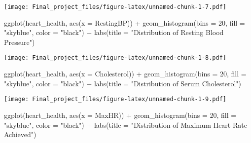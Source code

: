 \documentclass[
]{article}
\newenvironment{Shaded}{\begin{snugshade}}{\end{snugshade}}
\newcommand{\AttributeTok}[1]{\textcolor[rgb]{0.77,0.63,0.00}{#1}}
\newcommand{\DecValTok}[1]{\textcolor[rgb]{0.00,0.00,0.81}{#1}}
\newcommand{\FunctionTok}[1]{\textcolor[rgb]{0.00,0.00,0.00}{#1}}
\newcommand{\NormalTok}[1]{#1}
\newcommand{\SpecialCharTok}[1]{\textcolor[rgb]{0.00,0.00,0.00}{#1}}
\newcommand{\StringTok}[1]{\textcolor[rgb]{0.31,0.60,0.02}{#1}}
\begin{document}
\texttt{[image: Final\_project\_files/figure-latex/unnamed-chunk-1-7.pdf]}

\begin{Shaded}
\begin{Highlighting}[]
\FunctionTok{ggplot}\NormalTok{(heart\_health, }\FunctionTok{aes}\NormalTok{(}\AttributeTok{x =}\NormalTok{ RestingBP)) }\SpecialCharTok{+} 
  \FunctionTok{geom\_histogram}\NormalTok{(}\AttributeTok{bins =} \DecValTok{20}\NormalTok{, }\AttributeTok{fill =} \StringTok{"skyblue"}\NormalTok{, }\AttributeTok{color =} \StringTok{"black"}\NormalTok{) }\SpecialCharTok{+} 
  \FunctionTok{labs}\NormalTok{(}\AttributeTok{title =} \StringTok{"Distribution of Resting Blood Pressure"}\NormalTok{)}
\end{Highlighting}
\end{Shaded}

\texttt{[image: Final\_project\_files/figure-latex/unnamed-chunk-1-8.pdf]}

\begin{Shaded}
\begin{Highlighting}[]
\FunctionTok{ggplot}\NormalTok{(heart\_health, }\FunctionTok{aes}\NormalTok{(}\AttributeTok{x =}\NormalTok{ Cholesterol)) }\SpecialCharTok{+} 
  \FunctionTok{geom\_histogram}\NormalTok{(}\AttributeTok{bins =} \DecValTok{20}\NormalTok{, }\AttributeTok{fill =} \StringTok{"skyblue"}\NormalTok{, }\AttributeTok{color =} \StringTok{"black"}\NormalTok{) }\SpecialCharTok{+} 
  \FunctionTok{labs}\NormalTok{(}\AttributeTok{title =} \StringTok{"Distribution of Serum Cholesterol"}\NormalTok{)}
\end{Highlighting}
\end{Shaded}

\texttt{[image: Final\_project\_files/figure-latex/unnamed-chunk-1-9.pdf]}

\begin{Shaded}
\begin{Highlighting}[]
\FunctionTok{ggplot}\NormalTok{(heart\_health, }\FunctionTok{aes}\NormalTok{(}\AttributeTok{x =}\NormalTok{ MaxHR)) }\SpecialCharTok{+} 
  \FunctionTok{geom\_histogram}\NormalTok{(}\AttributeTok{bins =} \DecValTok{20}\NormalTok{, }\AttributeTok{fill =} \StringTok{"skyblue"}\NormalTok{, }\AttributeTok{color =} \StringTok{"black"}\NormalTok{) }\SpecialCharTok{+} 
  \FunctionTok{labs}\NormalTok{(}\AttributeTok{title =} \StringTok{"Distribution of Maximum Heart Rate Achieved"}\NormalTok{)}
\end{Highlighting}
\end{Shaded}
\end{document}
